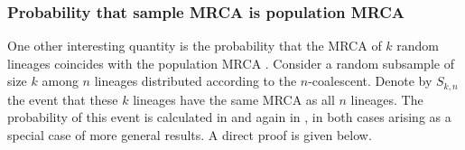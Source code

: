 \subsubsection{Probability that sample MRCA is population MRCA}
One other interesting quantity is the probability that the MRCA of $k$ random lineages coincides with the population MRCA \parencite[e.g.][Theorem 1.7]{durrett2008}.
Consider a random subsample of size $k$ among $n$ lineages distributed according to the $n$-coalescent.
Denote by $S_{k,n}$ the event that these $k$ lineages have the same MRCA as all $n$ lineages.
The probability of this event is calculated in \textcite[Example 1]{saunders1984} and again in \textcite[Equation (3)]{spouge2014}, in both cases arising as a special case of more general results. A direct proof is given below.

